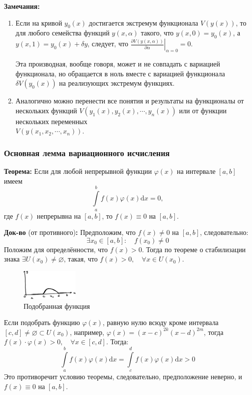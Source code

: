 \documentclass[12pt, a4paper]{article}
\newcommand{\di}{\mathrm{d}}
\begin{document}
\textbf{Замечания:}
\begin{enumerate}
 \item Если на кривой $y_0(x)$ достигается экстремум функционала $V(y(x))$, то для любого семейства функций $y(x, \alpha)$ такого, что $y(x, 0) = y_0(x)$, а $y(x, 1) = y_0(x) + \delta y$, следует, что $\left. \frac{\partial V(y(x, \alpha))}{\partial \alpha} \right|_{\alpha = 0} = 0$.
 
 Эта производная, вообще говоря, может и не совпадать с вариацией функционала, но обращается в ноль вместе с вариацией функционала $\delta V(y_0(x))$ на реализующих экстремум функциях. 
 \item Аналогично можно перенести все понятия и результаты на функционалы от нескольких функций $V(y_1(x), y_2(x), \cdots, y_n(x))$ или от функции нескольких переменных \\ $V(y(x_1, x_2, \cdots, x_n))$.
\end{enumerate}

\subsubsection{Основная лемма вариационного исчисления}

\textbf{Теорема:} Если для любой непрерывной функции $\varphi (x)$ на интервале $[a, b]$ имеем
\[\int \limits_a^b f(x) \varphi (x) \di x = 0,\]
где $f(x)$ непрерывна на $[a, b]$, то $f(x) \equiv 0$ на $[a, b]$.

\textbf{Док-во} (от противного)\textbf{:} Предположим, что $f(x) \not = 0$ на $[a, b]$, следовательно:
\[\exists x_0 \in [a, b]: \quad f(x_0) \not = 0 \]
Положим для определённости, что $f(x) > 0$. Тогда по теореме о стабилизации знака $\exists U(x_0) \not = \varnothing$, такая, что $f(x)>0, \quad \forall x \in U(x_0)$.

\begin{figure}
  \centering
  \vspace{-5mm}
  \includegraphics[width=0.25\textwidth]{22}
  \vspace{-8mm}
  \caption{Подобранная функция}
\end{figure}

Если подобрать функцию $\varphi (x)$, равную нулю всюду кроме интервала $[c, d] \not = \varnothing \subset U(x_0)$, например, $\varphi (x) = (x-c)^{2k}(x-d)^{2m}$, тогда $f(x) \cdot \varphi(x) > 0, \quad \forall x \in [c, d]$. Тогда:
\[\int \limits_a^b f(x) \varphi (x) \di x = \int \limits_c^d f(x) \varphi (x) \di x > 0 \]
Это противоречит условию теоремы, следовательно, предположение неверно, и $f(x) \equiv 0$ на $[a, b]$.
\end{document}

